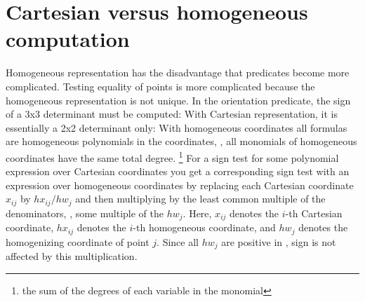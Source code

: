 \section{Cartesian versus homogeneous computation}
\label{sec:CartesianHomogeneousComputation}
Homogeneous representation has the disadvantage that predicates become
more complicated. Testing equality of points is more complicated because
the homogeneous representation is not unique. In the orientation predicate,
the sign of a 3x3 determinant must be computed:
With Cartesian representation, it is essentially a 2x2 determinant only:
With homogeneous coordinates all formulas are homogeneous polynomials
in the coordinates, \ie, all monomials of homogeneous coordinates
have the same total degree.%
\footnote{the sum of the degrees of each variable in the monomial} 
%
For a sign test for some polynomial expression over Cartesian coordinates 
you get a corresponding sign test with an expression over homogeneous 
coordinates by replacing 
each Cartesian coordinate $x_{ij}$ by $hx_{ij}/hw_j$ and then multiplying by
the least common multiple of the denominators, \ie, some multiple of
the $hw_j$. 
Here, $x_{ij}$ denotes the $i$-th Cartesian coordinate,
$hx_{ij}$ denotes the $i$-th homogeneous coordinate, and
$hw_j$ denotes the homogenizing coordinate of point $j$.
Since all $hw_j$ are positive in \cgal, sign is not affected
by this multiplication. 


